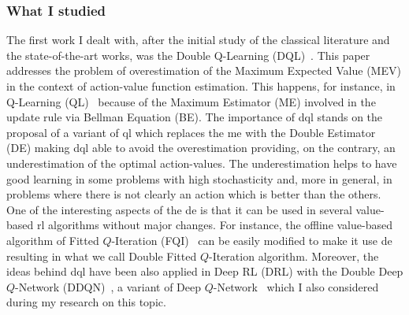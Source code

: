 \subsubsection{What I studied}
The first work I dealt with, after the initial study of the classical literature and the state-of-the-art works, was the Double Q-Learning (DQL)~\cite{van2010double}. This paper addresses the problem of overestimation of the Maximum Expected Value (MEV) in the context of action-value function estimation. This happens, for instance, in Q-Learning (QL)~\cite{smith2006optimizer} because of the Maximum Estimator (ME) involved in the update rule via Bellman Equation (BE). The importance of \gls{dql} stands on the proposal of a variant of \gls{ql} which replaces the \gls{me} with the Double Estimator (DE) making \gls{dql} able to avoid the overestimation providing, on the contrary, an underestimation of the optimal action-values. The underestimation helps to have good learning in some problems with high stochasticity and, more in general, in problems where there is not clearly an action which is better than the others. One of the interesting aspects of the \gls{de} is that it can be used in several value-based \gls{rl} algorithms without major changes. For instance, the offline value-based algorithm of Fitted $Q$-Iteration (FQI)~\cite{ernst2005tree} can be easily modified to make it use \gls{de} resulting in what we call Double Fitted $Q$-Iteration algorithm. Moreover, the ideas behind \gls{dql} have been also applied in Deep RL (DRL) with the Double Deep $Q$-Network (DDQN)~\cite{hasselt2015double}, a variant of Deep $Q$-Network~\cite{mnih2015human} which I also considered during my research on this topic.

